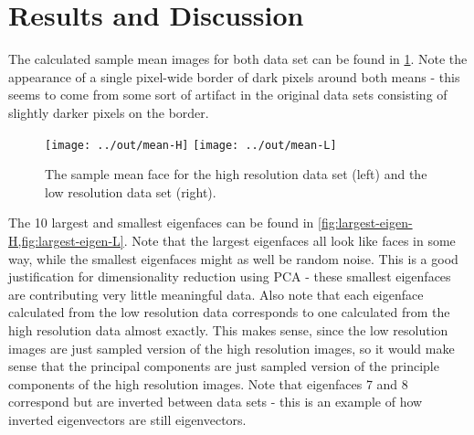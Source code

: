 \documentclass[headings=optiontoheadandtoc,listof=totoc,parskip=full]{scrartcl}
\begin{document}
\section{Results and Discussion}

The calculated sample mean images for both data set can be found in \cref{fig:sample-means}. Note the appearance of a single pixel-wide border of dark pixels around both means - this seems to come from some sort of artifact in the original data sets consisting of slightly darker pixels on the border.

\begin{figure}[H]
	\centering
	\texttt{[image: ../out/mean-H]} \quad
	\texttt{[image: ../out/mean-L]}
	\caption{The sample mean face for the high resolution data set (left) and the low resolution data set (right).}
	\label{fig:sample-means}
\end{figure}

The 10 largest and smallest eigenfaces can be found in \cref{fig:largest-eigen-H,fig:largest-eigen-L}. Note that the largest eigenfaces all look like faces in some way, while the smallest eigenfaces might as well be random noise. This is a good justification for dimensionality reduction using PCA - these smallest eigenfaces are contributing very little meaningful data. Also note that each eigenface calculated from the low resolution data corresponds to one calculated from the high resolution data almost exactly. This makes sense, since the low resolution images are just sampled version of the high resolution images, so it would make sense that the principal components are just sampled version of the principle components of the high resolution images. Note that eigenfaces 7 and 8 correspond but are inverted between data sets - this is an example of how inverted eigenvectors are still eigenvectors.
\end{document}
